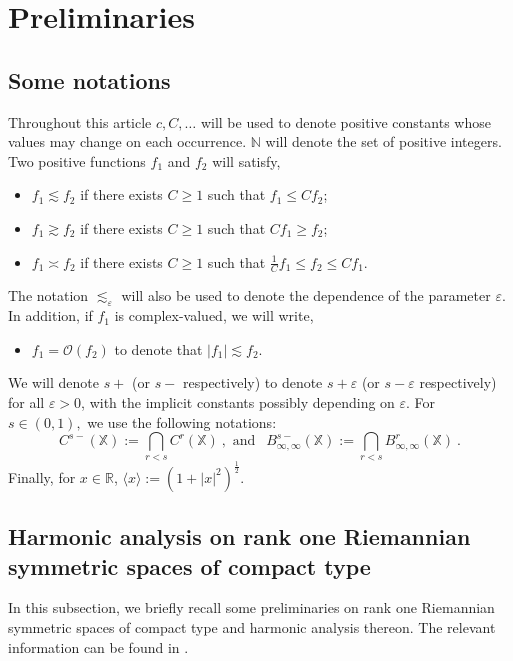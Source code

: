 \documentclass[12pt]{amsart}
\theoremstyle{definition}
\newcommand{\R}{\mathbb R}%
\newcommand{\N}{\mathbb N}%
\newcommand{\X}{\mathbb X}%
\numberwithin{equation}{section}
\begin{document}
\section{Preliminaries}
\label{sec2}
\subsection{Some notations} \label{subsec2.1}
Throughout this article $c,C,\dots$ will be used to denote positive constants whose values may change on each occurrence. $\N$ will denote the set of positive integers. Two positive functions $f_1$ and $f_2$ will satisfy,
\begin{itemize}
\item  $f_1 \lesssim f_2$ if there exists $C\ge 1$ such that $f_1 \le Cf_2$;
\item  $f_1 \gtrsim f_2$ if there exists $C\ge 1$ such that $Cf_1 \ge f_2$;
\item $f_1 \asymp f_2$ if there exists $C\ge 1$ such that $\frac{1}{C}f_1 \le f_2 \le Cf_1$.
\end{itemize}
The notation $\lesssim_\varepsilon$ will also be used to denote the dependence of the parameter $\varepsilon$. In addition, if $f_1$ is complex-valued, we will write,
\begin{itemize}
\item $f_1=\mathcal{O}(f_2)$ to denote that $|f_1| \lesssim f_2$\:.
\end{itemize} 
We will denote $s+$ (or $s-$ respectively) to denote $s+\varepsilon$ (or $s-\varepsilon$ respectively) for all $\varepsilon>0$, with the implicit constants possibly depending on $\varepsilon$. For $s \in (0,1),$ we use the following notations:
\begin{equation*}
C^{s-}\left(\X\right):=\displaystyle\bigcap_{r<s} C^{r}\left(\X\right)\:,\text{ and } \:\: B^{s-}_{\infty,\infty}\left(\X\right):=\displaystyle\bigcap_{r<s} B^{r}_{\infty,\infty}\left(\X\right)\:.
\end{equation*}
Finally, for $x \in \R$, $\langle x \rangle:=\left(1+|x|^2\right)^{\frac{1}{2}}$. 



\subsection{Harmonic analysis on rank one Riemannian symmetric spaces of compact type} \label{subsec2.2}

In this subsection, we briefly recall some preliminaries on rank one Riemannian symmetric spaces of compact type and harmonic analysis thereon. The relevant information can be found in \cite{Bonami,HelgasonDiff, Helgason,CT}.
\end{document}
